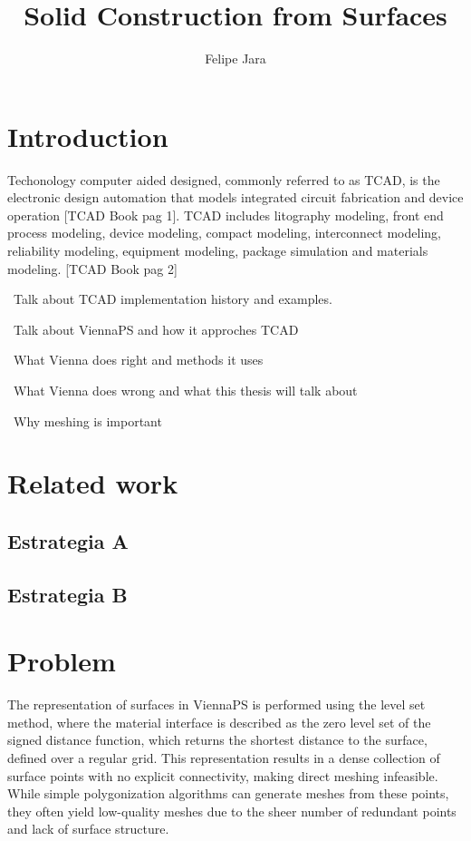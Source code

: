 \documentclass[submission]{eptcs}
\title{Solid Construction from Surfaces}
\author{ Felipe Jara
\institute{Department of Computer Science\\
University of Chile\\
Santiago, Chile}
\email{fjararibet@gmail.com}
}
\begin{document}
\maketitle

\section{Introduction}

Techonology computer aided designed, commonly referred to as TCAD, is the electronic design automation that models integrated circuit fabrication and device operation [TCAD Book pag 1]. TCAD includes litography modeling, front end process modeling, device modeling, compact modeling, interconnect modeling, reliability modeling, equipment modeling, package simulation and materials modeling. [TCAD Book pag 2]

~Talk about TCAD implementation history and examples.

~Talk about ViennaPS and how it approches TCAD

~What Vienna does right and methods it uses

~What Vienna does wrong and what this thesis will talk about

~Why meshing is important


\section{Related work}



\subsection{ Estrategia  A}




\subsection{ Estrategia B}


\section{Problem}

The representation of surfaces in ViennaPS is performed using the level set method, where the material interface is described as the zero level set of the signed distance function, which returns the shortest distance to the surface, defined over a regular grid. This representation results in a dense collection of surface points with no explicit connectivity, making direct meshing infeasible. While simple polygonization algorithms can generate meshes from these points, they often yield low-quality meshes due to the sheer number of redundant points and lack of surface structure. \\
\end{document}
